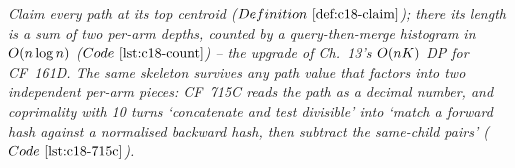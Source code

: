 \begin{recallbox}
\emph{Claim every path at its top centroid (\(\defref{c18-claim}\)); there its length
is a sum of two per-arm depths, counted by a query-then-merge histogram in
\(O(n\log n)\) (\(\coderef{c18-count}\)) -- the upgrade of Ch.~13's \(O(nK)\)
DP for CF~161D. The same skeleton survives any path value that factors into two
independent per-arm pieces: CF~715C reads the path as a decimal number, and
coprimality with 10 turns `concatenate and test divisible' into `match a forward
hash against a normalised backward hash, then subtract the same-child pairs'
(\(\coderef{c18-715c}\)).}
\end{recallbox}
